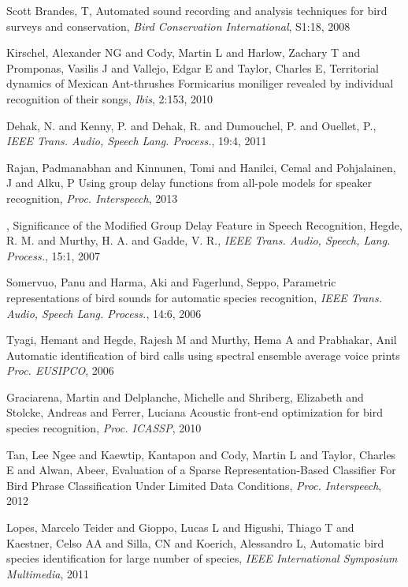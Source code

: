 \documentclass{article}
\begin{document}
\begin{thebibliography}{100}
Scott Brandes, T, Automated sound recording and analysis techniques for
bird surveys and conservation, \emph{Bird Conservation International}, S1:18, 2008

Kirschel, Alexander NG and Cody, Martin L and Harlow, Zachary T and Promponas,
Vasilis J and Vallejo, Edgar E and Taylor, Charles E,
Territorial dynamics of Mexican Ant-thrushes Formicarius moniliger revealed by
individual recognition of their songs, \emph{Ibis}, 2:153, 2010

Dehak, N. and Kenny, P. and Dehak, R. and Dumouchel, P. and Ouellet, P.,
\emph{IEEE Trans. Audio, Speech Lang. Process.}, 19:4, 2011

Rajan, Padmanabhan and Kinnunen, Tomi and Hanilci, Cemal and Pohjalainen, J and Alku, P
Using group delay functions from all-pole models for speaker recognition,
\emph{Proc. Interspeech}, 2013

,
Significance of the Modified Group Delay Feature in Speech Recognition,
Hegde, R. M. and Murthy, H. A. and Gadde, V. R.,
\emph{IEEE Trans. Audio, Speech, Lang. Process.},
15:1, 2007

Somervuo, Panu and Harma, Aki and Fagerlund, Seppo,
Parametric representations of bird sounds for automatic species recognition,
\emph{IEEE Trans. Audio, Speech Lang. Process.}, 14:6, 2006


Tyagi, Hemant and Hegde, Rajesh M and Murthy, Hema A and Prabhakar, Anil
Automatic identification of bird calls using spectral ensemble average voice prints
\emph{Proc. EUSIPCO}, 2006

Graciarena, Martin and Delplanche, Michelle and Shriberg, Elizabeth and Stolcke, Andreas and Ferrer, Luciana
Acoustic front-end optimization for bird species recognition,
\emph{Proc. ICASSP}, 2010

Tan, Lee Ngee and Kaewtip, Kantapon and Cody, Martin L and Taylor, Charles E and
Alwan, Abeer,
Evaluation of a Sparse Representation-Based Classifier For Bird Phrase
Classification Under Limited Data Conditions,
\emph{Proc. Interspeech}, 2012

Lopes, Marcelo Teider and Gioppo, Lucas L and Higushi, Thiago T and Kaestner,
Celso AA and Silla, CN and Koerich, Alessandro L,
Automatic bird species identification for large number of species,
\emph{IEEE International Symposium Multimedia}, 2011


\end{thebibliography}
\end{document}
